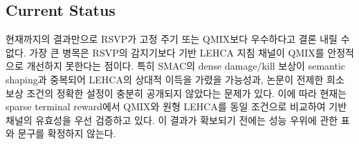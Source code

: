 \subsection{Current Status}

현재까지의 결과만으로 RSVP가 고정 주기 또는 QMIX보다 우수하다고 결론 내릴 수 없다.
가장 큰 병목은 RSVP의 감지기보다 기반 LEHCA 지침 채널이 QMIX를 안정적으로 개선하지
못한다는 점이다. 특히 SMAC의 dense damage/kill 보상이 semantic shaping과 중복되어
LEHCA의 상대적 이득을 가렸을 가능성과, 논문이 전제한 희소 보상 조건의 정확한 설정이
충분히 공개되지 않았다는 문제가 있다. 이에 따라 현재는 sparse terminal reward에서
QMIX와 원형 LEHCA를 동일 조건으로 비교하여 기반 채널의 유효성을 우선 검증하고 있다.
이 결과가 확보되기 전에는 성능 우위에 관한 표와 문구를 확정하지 않는다.
